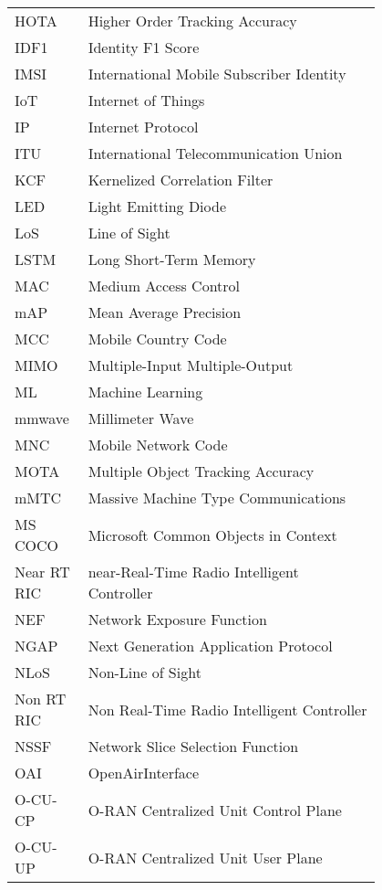 \begin{flushleft}
    \begin{tabular}{l p{0.8\linewidth}}
        HOTA & Higher Order Tracking Accuracy \\
        IDF1 & Identity F1 Score \\
        IMSI & International Mobile Subscriber Identity \\
        IoT & Internet of Things \\
        IP & Internet Protocol \\
        ITU & International Telecommunication Union \\
        KCF & Kernelized Correlation Filter \\
        LED & Light Emitting Diode \\
        LoS & Line of Sight \\
        LSTM & Long Short-Term Memory \\
        MAC & Medium Access Control \\
        mAP & Mean Average Precision \\
        MCC & Mobile Country Code \\
        MIMO & Multiple-Input Multiple-Output \\
        ML & Machine Learning \\
        mmwave & Millimeter Wave \\
        MNC & Mobile Network Code \\
        MOTA & Multiple Object Tracking Accuracy \\
        mMTC & Massive Machine Type Communications \\
        MS COCO & Microsoft Common Objects in Context \\
        Near RT RIC & near-Real-Time Radio Intelligent Controller \\
        NEF & Network Exposure Function \\
        NGAP & Next Generation Application Protocol \\
        NLoS & Non-Line of Sight \\
        Non RT RIC & Non Real-Time Radio Intelligent Controller \\
        NSSF & Network Slice Selection Function \\
        OAI & OpenAirInterface \\
        O-CU-CP & O-RAN Centralized Unit Control Plane \\
        O-CU-UP & O-RAN Centralized Unit User Plane \\

\end{tabular}
\end{flushleft}

